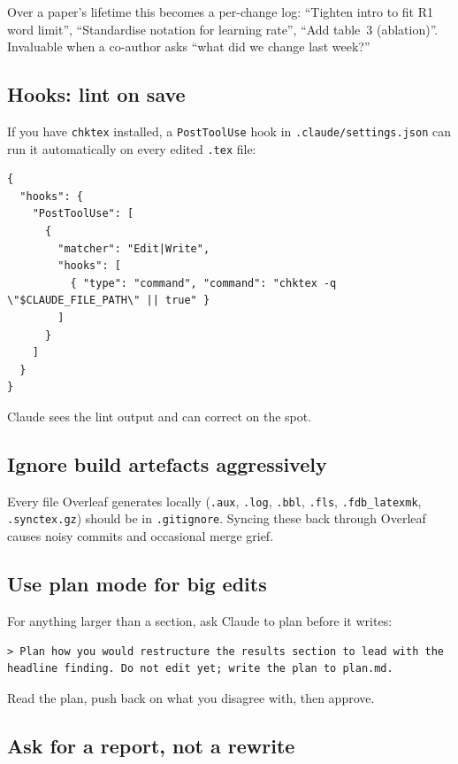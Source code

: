 Over a paper's lifetime this becomes a per-change log: ``Tighten intro to fit R1 word limit'', ``Standardise notation for learning rate'', ``Add table~3 (ablation)''. Invaluable when a co-author asks ``what did we change last week?''

\subsection{Hooks: lint on save}

If you have \verb|chktex| installed, a \verb|PostToolUse| hook in \verb|.claude/settings.json| can run it automatically on every edited \verb|.tex| file:

\begin{lstlisting}[style=shell]
{
  "hooks": {
    "PostToolUse": [
      {
        "matcher": "Edit|Write",
        "hooks": [
          { "type": "command", "command": "chktex -q \"$CLAUDE_FILE_PATH\" || true" }
        ]
      }
    ]
  }
}
\end{lstlisting}

\noindent Claude sees the lint output and can correct on the spot.

\subsection{Ignore build artefacts aggressively}

Every file Overleaf generates locally (\verb|.aux|, \verb|.log|, \verb|.bbl|, \verb|.fls|, \verb|.fdb_latexmk|, \verb|.synctex.gz|) should be in \verb|.gitignore|. Syncing these back through Overleaf causes noisy commits and occasional merge grief.

\subsection{Use plan mode for big edits}

For anything larger than a section, ask Claude to plan before it writes:

\begin{lstlisting}[style=prompt]
> Plan how you would restructure the results section to lead with the headline finding. Do not edit yet; write the plan to plan.md.
\end{lstlisting}

\noindent Read the plan, push back on what you disagree with, then approve.

\subsection{Ask for a report, not a rewrite}


